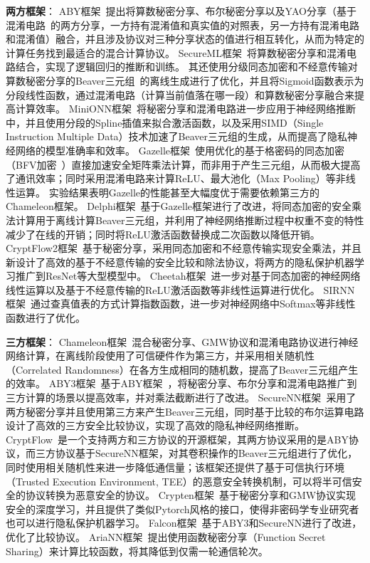 \textbf{两方框架}：
ABY框架~\cite{demmler2015aby}提出将算数秘密分享、布尔秘密分享以及YAO分享（基于混淆电路~\cite{yao1986gc}的两方分享，一方持有混淆值和真实值的对照表，另一方持有混淆电路和混淆值）融合，并且涉及协议对三种分享状态的值进行相互转化，从而为特定的计算任务找到最适合的混合计算协议。
%
SecureML框架~\cite{mohassel2017secureml}将算数秘密分享和混淆电路结合，实现了逻辑回归的推断和训练。
%
其还使用分级同态加密和不经意传输对算数秘密分享的Beaver三元组~\cite{beaver1992efficient}的离线生成进行了优化，并且将Sigmoid函数表示为分段线性函数，通过混淆电路（计算当前值落在哪一段）和算数秘密分享融合来提高计算效率。
%
MiniONN框架~\cite{liujian2017minionn}将秘密分享和混淆电路进一步应用于神经网络推断中，并且使用分段的Spline插值来拟合激活函数，以及采用SIMD（Single Instruction Multiple Data）技术加速了Beaver三元组的生成，从而提高了隐私神经网络的模型准确率和效率。
%
Gazelle框架~\cite{juvekar2018gazelle}使用优化的基于格密码的同态加密（BFV加密~\cite{2012bfv1,2012bfv2}）直接加速安全矩阵乘法计算，而非用于产生三元组，从而极大提高了通讯效率；同时采用混淆电路来计算ReLU、最大池化（Max Pooling）等非线性运算。
实验结果表明Gazelle的性能甚至大幅度优于需要依赖第三方的Chameleon框架。
%
Delphi框架~\cite{mishra2020delphi}基于Gazelle框架进行了改进，将同态加密的安全乘法计算用于离线计算Beaver三元组，并利用了神经网络推断过程中权重不变的特性减少了在线的开销；同时将ReLU激活函数替换成二次函数以降低开销。
%
CryptFlow2框架~\cite{rathee2020cryptflow2}基于秘密分享，采用同态加密和不经意传输实现安全乘法，并且新设计了高效的基于不经意传输的安全比较和除法协议，将两方的隐私保护机器学习推广到ResNet等大型模型中。
%
Cheetah框架~\cite{huang2022cheetah}进一步对基于同态加密的神经网络线性运算以及基于不经意传输的ReLU激活函数等非线性运算进行优化。
SIRNN框架~\cite{rathee2021sirnn}通过查真值表的方式计算指数函数，进一步对神经网络中Softmax等非线性函数进行了优化。

\textbf{三方框架}：
Chameleon框架~\cite{riazi_2018_chameleon}混合秘密分享、GMW协议和混淆电路协议进行神经网络计算，在离线阶段使用了可信硬件作为第三方，并采用相关随机性（Correlated Randomness）在各方生成相同的随机数，提高了Beaver三元组产生的效率。
%
ABY3框架~\cite{mohassel2018aby3}基于ABY框架~\cite{demmler2015aby}，将秘密分享、布尔分享和混淆电路推广到三方计算的场景以提高效率，并对乘法截断进行了改进。
%
SecureNN框架~\cite{wagh2019securenn}采用了两方秘密分享并且使用第三方来产生Beaver三元组，同时基于比较的布尔运算电路设计了高效的三方安全比较协议，实现了高效的隐私神经网络推断。
%
CryptFlow~\cite{kumar2020cryptflow}是一个支持两方和三方协议的开源框架，其两方协议采用的是ABY协议，而三方协议基于SecureNN框架，对其卷积操作的Beaver三元组进行了优化，同时使用相关随机性来进一步降低通信量；该框架还提供了基于可信执行环境（Trusted Execution Environment, TEE）的恶意安全转换机制，可以将半可信安全的协议转换为恶意安全的协议。
%
Crypten框架~\cite{knott2021crypten}基于秘密分享和GMW协议实现安全的深度学习，并且提供了类似Pytorch风格的接口，使得非密码学专业研究者也可以进行隐私保护机器学习。
%
Falcon框架~\cite{wagh2021falcon}基于ABY3和SecureNN进行了改进，优化了比较协议。
%
AriaNN框架~\cite{ryffel2021ariann}提出使用函数秘密分享（Function Secret Sharing）来计算比较函数，将其降低到仅需一轮通信轮次。

